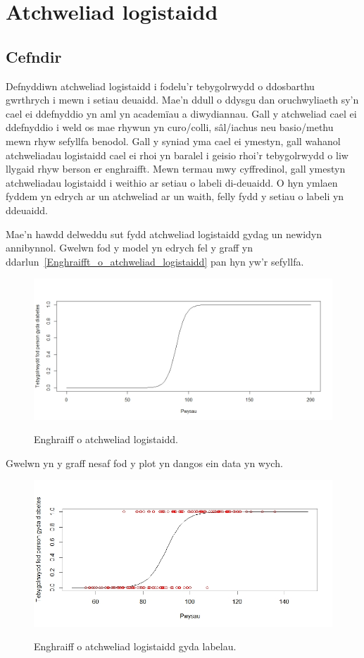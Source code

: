 \chapter{Atchweliad logistaidd}\label{cha:Atchweliad_logistaidd}
\section{Cefndir}
Defnyddiwn atchweliad logistaidd i fodelu'r tebygolrwydd o ddosbarthu gwrthrych i mewn i setiau deuaidd. Mae'n ddull o ddysgu dan oruchwyliaeth sy'n cael ei ddefnyddio yn aml yn academ\"{i}au a diwydiannau. Gall y atchweliad cael ei ddefnyddio i weld os mae rhywun yn curo/colli, s\^{a}l/iachus neu basio/methu mewn rhyw sefyllfa benodol. Gall y syniad yma cael ei ymestyn, gall wahanol atchweliadau logistaidd cael ei rhoi yn baralel i geisio rhoi'r tebygolrwydd o liw llygaid rhyw berson er enghraifft. Mewn termau mwy cyffredinol, gall ymestyn atchweliadau logistaidd i weithio ar setiau o labeli di-deuaidd. O hyn ymlaen fyddem yn edrych ar un atchweliad ar un waith, felly fydd y setiau o labeli yn ddeuaidd.

Mae'n hawdd delweddu sut fydd atchweliad logistaidd gydag un newidyn annibynnol. Gwelwn fod y model yn edrych fel y graff yn ddarlun~\ref{Enghraifft_o_atchweliad_logistaidd} pan hyn yw'r sefyllfa.

\begin{figure}[H]
\begin{center}
\includegraphics[width=0.5\linewidth]{../img/Atchweliad_logistaidd.jpeg}
\label{fig:Enghraifft_o_atchweliad_logistaidd}
\caption{Enghraiff o atchweliad logistaidd.}
\end{center}
\end{figure}

Gwelwn yn y graff nesaf fod y plot yn dangos ein data yn wych.

\begin{figure}[H]
\begin{center}
\includegraphics[width=0.5\linewidth]{../img/atchweliad_logistaidd_pwyntiau.jpeg}
\label{fig:Enghraifft_o_atchweliad_logistaidd_pwyntiau}
\caption{Enghraiff o atchweliad logistaidd gyda labelau.}
\end{center}
\end{figure}

